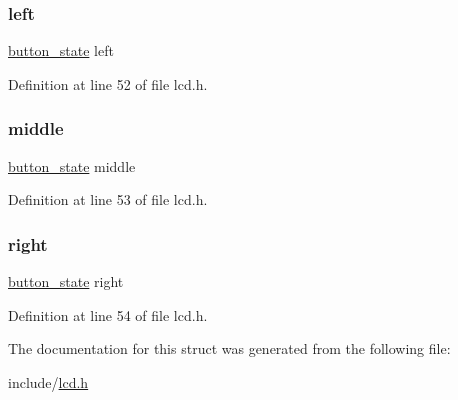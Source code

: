 \subsubsection{\texorpdfstring{left}{left}}
{\footnotesize\ttfamily \hyperlink{lcd_8h_a0bbab92f5605e16a4162b6c5ccc2c29b}{button\+\_\+state} left}



Definition at line 52 of file lcd.\+h.

\mbox{\label{structlcd__buttons_a682104bb266b516795b8533f269e0c74}} 
\subsubsection{\texorpdfstring{middle}{middle}}
{\footnotesize\ttfamily \hyperlink{lcd_8h_a0bbab92f5605e16a4162b6c5ccc2c29b}{button\+\_\+state} middle}



Definition at line 53 of file lcd.\+h.

\mbox{\label{structlcd__buttons_adfa688bb1cef42853f6eb2061f726e19}} 
\subsubsection{\texorpdfstring{right}{right}}
{\footnotesize\ttfamily \hyperlink{lcd_8h_a0bbab92f5605e16a4162b6c5ccc2c29b}{button\+\_\+state} right}



Definition at line 54 of file lcd.\+h.



The documentation for this struct was generated from the following file\+:\begin{DoxyCompactItemize}
\item 
include/\hyperlink{lcd_8h}{lcd.\+h}\end{DoxyCompactItemize}
